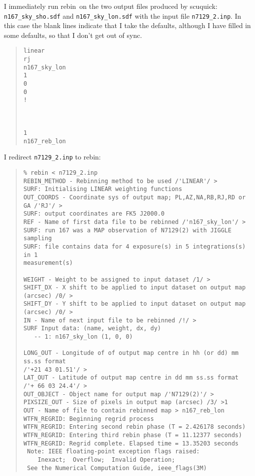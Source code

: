 \documentclass[twoside,11pt]{article}
\newenvironment{myquote}{\begin{quote}\begin{small}}{\end{small}\end{quote}}
\newcommand{\task}[1]{\textsf{#1}}
\newcommand{\rebin}{\xref{\task{rebin}}{sun216}{REBIN}}
\newcommand{\scuquick}{\xref{\task{scuquick}}{sun216}{SCUQUICK}}
\newcommand{\xref}[3]{#1}
\begin{document}
I immediately run \rebin\ on the two output files produced by
\scuquick: \texttt{n167\_sky\_sho.sdf} and \texttt{n167\_sky\_lon.sdf} with
the input file \texttt{n7129\_2.inp}. In this case the blank lines indicate
that I take the defaults, although I have filled in some defaults,
so that I don't get out of sync.

\begin{myquote} \begin{verbatim}
linear
rj
n167_sky_lon
1
0
0
!



1
n167_reb_lon
\end{verbatim} \end{myquote}

I redirect \texttt{n7129\_2.inp} to rebin:

\begin{myquote} \begin{verbatim}
% rebin < n7129_2.inp
REBIN_METHOD - Rebinning method to be used /'LINEAR'/ > 
SURF: Initialising LINEAR weighting functions
OUT_COORDS - Coordinate sys of output map; PL,AZ,NA,RB,RJ,RD or GA /'RJ'/ > 
SURF: output coordinates are FK5 J2000.0
REF - Name of first data file to be rebinned /'n167_sky_lon'/ > 
SURF: run 167 was a MAP observation of N7129(2) with JIGGLE sampling
SURF: file contains data for 4 exposure(s) in 5 integrations(s) in 1
measurement(s)
 
WEIGHT - Weight to be assigned to input dataset /1/ > 
SHIFT_DX - X shift to be applied to input dataset on output map (arcsec) /0/ >
SHIFT_DY - Y shift to be applied to input dataset on output map (arcsec) /0/ > 
IN - Name of next input file to be rebinned /!/ > 
SURF Input data: (name, weight, dx, dy)
   -- 1: n167_sky_lon (1, 0, 0)
 
LONG_OUT - Longitude of of output map centre in hh (or dd) mm ss.ss format
/'+21 43 01.51'/ > 
LAT_OUT - Latitude of output map centre in dd mm ss.ss format 
/'+ 66 03 24.4'/ > 
OUT_OBJECT - Object name for output map /'N7129(2)'/ > 
PIXSIZE_OUT - Size of pixels in output map (arcsec) /3/ >1 
OUT - Name of file to contain rebinned map > n167_reb_lon
WTFN_REGRID: Beginning regrid process
WTFN_REGRID: Entering second rebin phase (T = 2.426178 seconds)
WTFN_REGRID: Entering third rebin phase (T = 11.12377 seconds)
WTFN_REGRID: Regrid complete. Elapsed time = 13.35203 seconds
 Note: IEEE floating-point exception flags raised: 
    Inexact;  Overflow;  Invalid Operation; 
 See the Numerical Computation Guide, ieee_flags(3M) 
\end{verbatim} \end{myquote}
\end{document}
